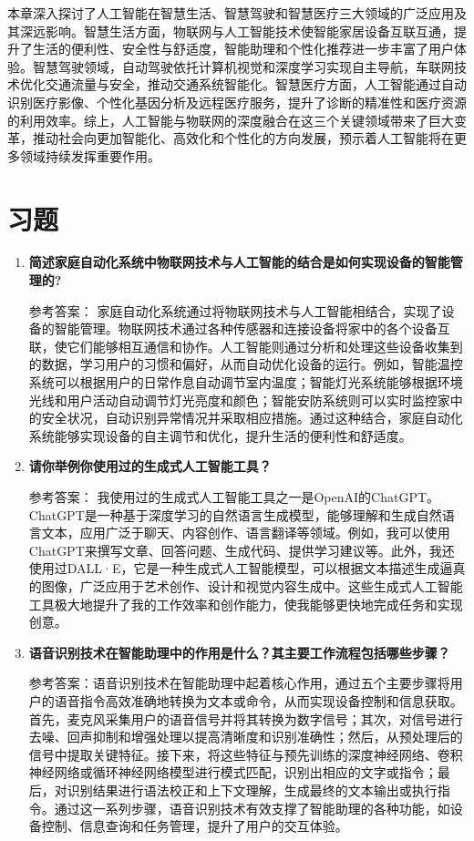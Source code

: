 本章深入探讨了人工智能在智慧生活、智慧驾驶和智慧医疗三大领域的广泛应用及其深远影响。智慧生活方面，物联网与人工智能技术使智能家居设备互联互通，提升了生活的便利性、安全性与舒适度，智能助理和个性化推荐进一步丰富了用户体验。智慧驾驶领域，自动驾驶依托计算机视觉和深度学习实现自主导航，车联网技术优化交通流量与安全，推动交通系统智能化。智慧医疗方面，人工智能通过自动识别医疗影像、个性化基因分析及远程医疗服务，提升了诊断的精准性和医疗资源的利用效率。综上，人工智能与物联网的深度融合在这三个关键领域带来了巨大变革，推动社会向更加智能化、高效化和个性化的方向发展，预示着人工智能将在更多领域持续发挥重要作用。

\section*{习题}
\begin{enumerate}
\item \textbf{简述家庭自动化系统中物联网技术与人工智能的结合是如何实现设备的智能管理的?}

参考答案： 家庭自动化系统通过将物联网技术与人工智能相结合，实现了设备的智能管理。物联网技术通过各种传感器和连接设备将家中的各个设备互联，使它们能够相互通信和协作。人工智能则通过分析和处理这些设备收集到的数据，学习用户的习惯和偏好，从而自动优化设备的运行。例如，智能温控系统可以根据用户的日常作息自动调节室内温度；智能灯光系统能够根据环境光线和用户活动自动调节灯光亮度和颜色；智能安防系统则可以实时监控家中的安全状况，自动识别异常情况并采取相应措施。通过这种结合，家庭自动化系统能够实现设备的自主调节和优化，提升生活的便利性和舒适度。

\item \textbf{请你举例你使用过的生成式人工智能工具？}

参考答案： 我使用过的生成式人工智能工具之一是OpenAI的ChatGPT。ChatGPT是一种基于深度学习的自然语言生成模型，能够理解和生成自然语言文本，应用广泛于聊天、内容创作、语言翻译等领域。例如，我可以使用ChatGPT来撰写文章、回答问题、生成代码、提供学习建议等。此外，我还使用过DALL·E，它是一种生成式人工智能模型，可以根据文本描述生成逼真的图像，广泛应用于艺术创作、设计和视觉内容生成中。这些生成式人工智能工具极大地提升了我的工作效率和创作能力，使我能够更快地完成任务和实现创意。

\item \textbf{语音识别技术在智能助理中的作用是什么？其主要工作流程包括哪些步骤？}

参考答案：语音识别技术在智能助理中起着核心作用，通过五个主要步骤将用户的语音指令高效准确地转换为文本或命令，从而实现设备控制和信息获取。首先，麦克风采集用户的语音信号并将其转换为数字信号；其次，对信号进行去噪、回声抑制和增强处理以提高清晰度和识别准确性；然后，从预处理后的信号中提取关键特征。接下来，将这些特征与预先训练的深度神经网络、卷积神经网络或循环神经网络模型进行模式匹配，识别出相应的文字或指令；最后，对识别结果进行语法校正和上下文理解，生成最终的文本输出或执行指令。通过这一系列步骤，语音识别技术有效支撑了智能助理的各种功能，如设备控制、信息查询和任务管理，提升了用户的交互体验。


\end{enumerate}
